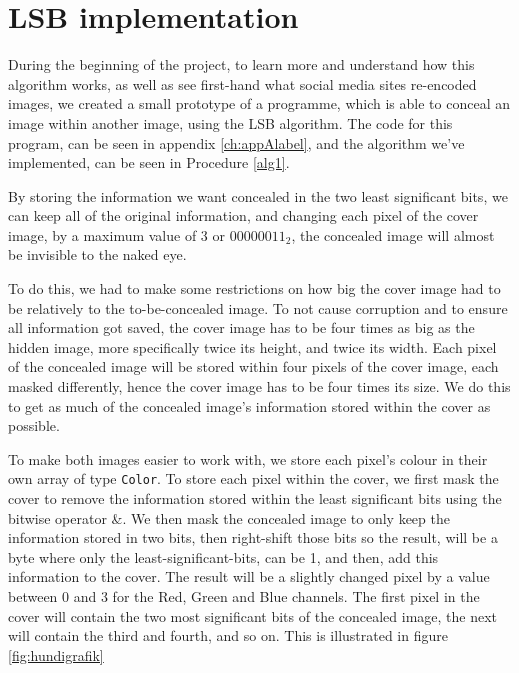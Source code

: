 \section{LSB implementation}
\label{sec:lsb-implementation}
During the beginning of the project, to learn more and understand how this algorithm works, as well as see first-hand what social media sites re-encoded images, we created a small prototype of a programme, which is able to conceal an image within another image, using the LSB algorithm. The code for this program, can be seen in appendix \ref{ch:appAlabel}, and the algorithm we've implemented, can be seen in Procedure \ref{alg1}.

By storing the information we want concealed in the two least significant bits, we can keep all of the original information, and changing each pixel of the cover image, by a maximum value of 3 or $00000011_2$, the concealed image will almost be invisible to the naked eye.

To do this, we had to make some restrictions on how big the cover image had to be relatively to the to-be-concealed image. 
To not cause corruption and to ensure all information got saved, the cover image has to be four times as big as the hidden image, more specifically twice its height, and twice its width. 
Each pixel of the concealed image will be stored within four pixels of the cover image, each masked differently, hence the cover image has to be four times its size. 
We do this to get as much of the concealed image's information stored within the cover as possible.

To make both images easier to work with, we store each pixel's colour in their own array of type \lstinline|Color|.
To store each pixel within the cover, we first mask the cover to remove the information stored within the least significant bits using the bitwise operator \&. 
We then mask the concealed image to only keep the information stored in two bits, then right-shift those bits so the result, will be a byte where only the least-significant-bits, can be 1, and then, add this information to the cover. 
The result will be a slightly changed pixel by a value between 0 and 3 for the Red, Green and Blue channels. 
The first pixel in the cover will contain the two most significant bits of the concealed image, the next will contain the third and fourth, and so on. This is illustrated in figure \ref{fig:hundigrafik}

